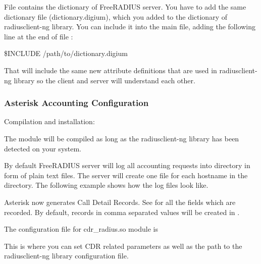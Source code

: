 	File  contains the dictionary of
	FreeRADIUS server. You have to add the same dictionary file
	(dictionary.digium), which you added to the dictionary of radiusclient-ng
	library. You can include it into the main file, adding the following line at the
	end of file :

	\$INCLUDE /path/to/dictionary.digium

	That will include the same new attribute definitions that are used
	in radiusclient-ng library so the client and server will understand each
	other.


\subsubsection{Asterisk Accounting Configuration}

	Compilation and installation:

        The module will be compiled as long as the radiusclient-ng
        library has been detected on your system.

	By default FreeRADIUS server will log all accounting requests into
	 directory in form of plain text files.
	The server will create one file for each hostname in the directory. The
	following example shows how the log files look like.

	Asterisk now generates Call Detail Records. See 
	for all the fields which are recorded. By default, records in comma
	separated values will be created in .

	The configuration file for cdr_radius.so module is 

	This is where you can set CDR related parameters as well as the path to
	the radiusclient-ng library configuration file.


